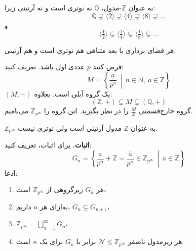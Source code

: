\begin{frame}
    \begin{example}
        به عنوان $\mathbb{Z}$-مدول، $\mathbb{Q}$ نه نوتری است و نه آرتینی زیرا:
        \[
            \mathbb{Q} \supsetneq \langle 2 \rangle \supsetneq \langle 4 \rangle \supsetneq \langle 8 \rangle \supsetneq \dots
        \]
        و
        \[
            \langle \tfrac12 \rangle \subsetneq \langle \tfrac14 \rangle \subsetneq \langle \tfrac18 \rangle \subsetneq \dots
        \]
    \end{example}

    \begin{example}
        هر فضای برداری با بعد متناهی هم نوتری است و هم آرتینی.
    \end{example}

\end{frame}
\begin{frame}
    \begin{definition}
        فرض کنید $p$ عددی اول باشد. تعریف کنید:
        \[
            M = \left\{ \frac{a}{p^n} \ \middle| \ n \in \mathbb{N},\ a \in \mathbb{Z} \right\}
        \]
        $(M, +)$ یک گروه آبلی است.  بعلاوه:
        \[
            (\mathbb{Z}, +) \subsetneq M \subsetneq (\mathbb{Q}, +)
        \]
        گروه خارج‌قسمتی $\frac{M}{\mathbb{Z}}$ را در نظر بگیرید. این گروه را $\mathbb{Z}_{p^\infty}$ می‌نامیم.

    \end{definition}

\end{frame}

\begin{frame}
    \begin{example}
        $\mathbb{Z}_{p^\infty}$ به عنوان $\mathbb{Z}$-مدول آرتینی است ولی نوتری نیست.
    \end{example}
    \textbf{اثبات.}
    برای اثبات، تعریف کنید:
    \[
        G_n = \left\{ \frac{a}{p^n} + \mathbb{Z} = \overline{\frac{a}{p^n}} \in \mathbb{Z}_{p^\infty} \ \middle| \ a \in \mathbb{Z} \right\}
    \]
    ادعا:


    \begin{tblock}{}
        \begin{enumerate}
            \item هر $G_n$ زیرگروهی از $\mathbb{Z}_{p^\infty}$ است،
            \item به‌ازای هر ‌‌\(‌n\) داریم، \(G_n \subsetneq G_{n+1} \)،
            \item \(\mathbb{Z}_{p^\infty} = \bigcup_{n=1}^\infty G_n\)،
            \item  هر زیرمدول ناصفر $\mathcal{N} \leqslant \mathbb{Z}_{p^\infty}$ برابر با $G_n$ برای یک $n$ است.
        \end{enumerate}

    \end{tblock}

\end{frame}

